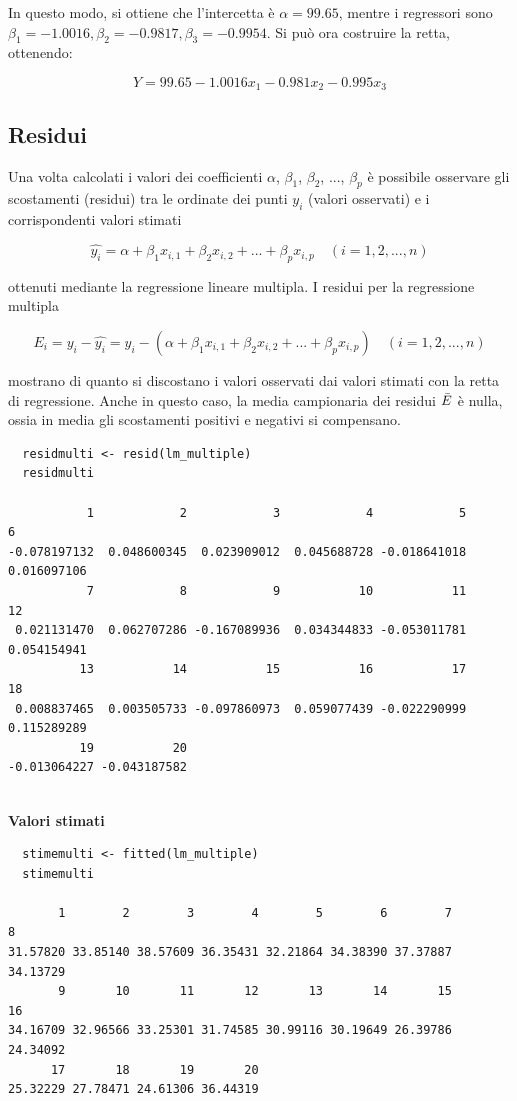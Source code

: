 In questo modo, si ottiene che l'intercetta è $\alpha = 99.65$, mentre i regressori sono $\beta_1 = -1.0016, \beta_2 = -0.9817, \beta_3 = -0.9954$.
Si può ora costruire la retta, ottenendo:

\[Y = 99.65 - 1.0016x_1 - 0.981x_2 - 0.995x_3\]

\subsection{Residui}\label{cap4.3.1}

Una volta calcolati i valori dei coefficienti $\alpha$, $\beta_1$, $\beta_2$, ..., $\beta_p$ è possibile osservare gli scostamenti (residui) tra le ordinate dei punti $y_i$ (valori osservati) e i corrispondenti valori stimati

\[\hat{y_i} = \alpha + \beta_1 x_{i, 1} + \beta_2 x_{i, 2} + ... + \beta_p x_{i, p} \quad (i = 1, 2, ..., n)\]

ottenuti mediante la regressione lineare multipla. I residui per la regressione multipla

\[E_i = y_i - \hat{y_i} = y_i - (\alpha + \beta_1 x_{i, 1} + \beta_2 x_{i, 2} + ... + \beta_p x_{i, p}) \quad (i = 1, 2, ..., n) \]

mostrano di quanto si discostano i valori osservati dai valori stimati con la retta di regressione. Anche in questo caso, la media campionaria dei residui $\Bar{E}$ è nulla, ossia in media gli scostamenti positivi e negativi si compensano.


\vspace{5mm}
\begin{lstlisting}
  residmulti <- resid(lm_multiple)
  residmulti

           1            2            3            4            5            6 
-0.078197132  0.048600345  0.023909012  0.045688728 -0.018641018  0.016097106 
           7            8            9           10           11           12 
 0.021131470  0.062707286 -0.167089936  0.034344833 -0.053011781  0.054154941 
          13           14           15           16           17           18 
 0.008837465  0.003505733 -0.097860973  0.059077439 -0.022290999  0.115289289 
          19           20 
-0.013064227 -0.043187582  
  
\end{lstlisting}
\vspace{5mm}

\noindent \textbf{Valori stimati}

\vspace{5mm}
\begin{lstlisting}
  stimemulti <- fitted(lm_multiple)
  stimemulti

       1        2        3        4        5        6        7        8 
31.57820 33.85140 38.57609 36.35431 32.21864 34.38390 37.37887 34.13729 
       9       10       11       12       13       14       15       16 
34.16709 32.96566 33.25301 31.74585 30.99116 30.19649 26.39786 24.34092 
      17       18       19       20 
25.32229 27.78471 24.61306 36.44319  
  
\end{lstlisting}
\vspace{5mm}

